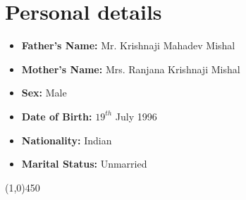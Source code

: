 \documentclass[10pt]{article}
\begin{document}
\section{Personal details}
\begin{itemize}
	\item \textbf{Father's Name:} Mr. Krishnaji Mahadev Mishal
	\item \textbf{Mother's Name:} Mrs. Ranjana Krishnaji Mishal
	\item \textbf{Sex:} Male
	\item\textbf{Date of Birth:} $19^{th}$ July 1996
	\item \textbf{Nationality:} Indian
	\item\textbf{Marital Status:} Unmarried
\end{itemize}

\begin{center}
	\line(1,0){450}
\end{center}
\end{document}
